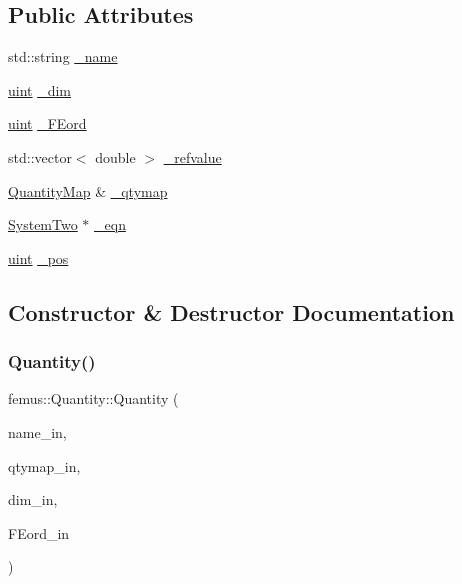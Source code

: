 \subsection*{Public Attributes}
\begin{DoxyCompactItemize}
\item 
std\+::string \mbox{\hyperlink{classfemus_1_1_quantity_a2113c408ee4894785744e5d51d04d8a1}{\+\_\+name}}
\item 
\mbox{\hyperlink{_typedefs_8hpp_a91ad9478d81a7aaf2593e8d9c3d06a14}{uint}} \mbox{\hyperlink{classfemus_1_1_quantity_a02cbc5c7424ea769813d2baa1806dae1}{\+\_\+dim}}
\item 
\mbox{\hyperlink{_typedefs_8hpp_a91ad9478d81a7aaf2593e8d9c3d06a14}{uint}} \mbox{\hyperlink{classfemus_1_1_quantity_a4deff955409b251411cabda37da8454b}{\+\_\+\+F\+Eord}}
\item 
std\+::vector$<$ double $>$ \mbox{\hyperlink{classfemus_1_1_quantity_ab3cbe19ad5d88005b2500d2841e6cc9e}{\+\_\+refvalue}}
\item 
\mbox{\hyperlink{classfemus_1_1_quantity_map}{Quantity\+Map}} \& \mbox{\hyperlink{classfemus_1_1_quantity_a0298acf9a0633002493ec18fbd3ec612}{\+\_\+qtymap}}
\item 
\mbox{\hyperlink{classfemus_1_1_system_two}{System\+Two}} $\ast$ \mbox{\hyperlink{classfemus_1_1_quantity_ae70471ba24f6f1f2d3d4d3beb190ff9a}{\+\_\+eqn}}
\item 
\mbox{\hyperlink{_typedefs_8hpp_a91ad9478d81a7aaf2593e8d9c3d06a14}{uint}} \mbox{\hyperlink{classfemus_1_1_quantity_a5fde895b04b6561196673ecd2c9c0f42}{\+\_\+pos}}
\end{DoxyCompactItemize}


\subsection{Constructor \& Destructor Documentation}
\mbox{\label{classfemus_1_1_quantity_a4c7c6c1b89c12e1f1ed8df29d36b6c9e}} 
\subsubsection{\texorpdfstring{Quantity()}{Quantity()}}
{\footnotesize\ttfamily femus\+::\+Quantity\+::\+Quantity (\begin{DoxyParamCaption}\item[{std\+::string}]{name\+\_\+in,  }\item[{\mbox{\hyperlink{classfemus_1_1_quantity_map}{Quantity\+Map}} \&}]{qtymap\+\_\+in,  }\item[{\mbox{\hyperlink{_typedefs_8hpp_a91ad9478d81a7aaf2593e8d9c3d06a14}{uint}}}]{dim\+\_\+in,  }\item[{\mbox{\hyperlink{_typedefs_8hpp_a91ad9478d81a7aaf2593e8d9c3d06a14}{uint}}}]{F\+Eord\+\_\+in }\end{DoxyParamCaption})}

